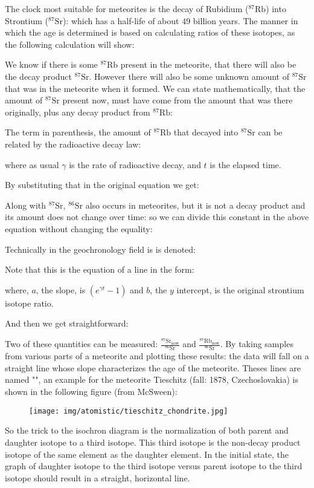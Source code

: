 	The clock most suitable for meteorites is the decay of Rubidium ($^{87}\mathrm{Rb}$) into Strontium ($^{87}\mathrm{Sr}$): which has a half-life of about $49$ billion years. The manner in which the age is determined is based on calculating ratios of these isotopes, as the following
calculation will show:

	We know if there is some $^{87}\mathrm{Rb}$ present in the meteorite, that there will also be the decay product $^{87}\mathrm{Sr}$. However there will also be some unknown amount of $^{87}\mathrm{Sr}$ that was in the meteorite when it formed. We can state mathematically, that the amount of $^{87}\mathrm{Sr}$ present now, must have come from the amount that was there originally,  plus any decay product from $^{87}\mathrm{Rb}$:
	
	The term in parenthesis, the amount of $^{87}\mathrm{Rb}$ that decayed into $^{87}\mathrm{Sr}$
can be related by the radioactive decay law:
	
	where as usual $\gamma$ is the rate of radioactive decay, and $t$ is the elapsed time.

	By substituting that in the original equation we get:
	
	Along with $^{87}\mathrm{Sr}$, $^{86}\mathrm{Sr}$ also occurs in meteorites, but it is not a decay product and its amount does not change over time: so we can divide this constant in the above equation without changing the equality:
	
	Technically in the geochronology field is is denoted:
	
	Note that this is the equation of a line in the form:
	
	where, $a$, the slope, is $\left(e^{\gamma t}-1\right)$ and $b$, the $y$ intercept, is the original strontium isotope ratio. 
	
	And then we get straightforward:
	
	
	Two of these quantities can be measured: $\frac{^{87}\mathrm{Sr}_\text{now}}{^{86}\mathrm{Sr}}$ and $\frac{^{87}\mathrm{Rb}_\text{now}}{^{86}\mathrm{Sr}}$. By taking samples from various parts of a meteorite and plotting these results: the data will fall on a straight line whose slope characterizes the age of the meteorite. Theses lines are named "", an example for the meteorite Tieschitz (fall: 1878, Czechoslovakia) is shown in the following figure (from McSween):
	\begin{figure}[H]
		\centering
		\texttt{[image: img/atomistic/tieschitz\_chondrite.jpg]}
	\end{figure}
	So the trick to the isochron diagram is the normalization of both parent and daughter isotope to a third isotope. This third isotope is the non-decay product isotope of the same element as the daughter element. In the initial state, the graph of daughter isotope to the third isotope versus parent isotope to the third isotope should result in a straight, horizontal line.
	
